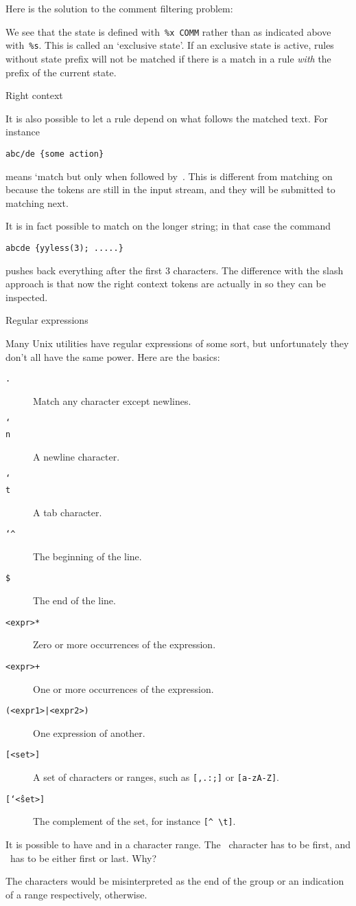 Here is the solution to the comment filtering problem:
%

%
We see that the state is defined
with~\verb+%x COMM+ rather than as indicated above with~\verb+%s+. This is
called an `exclusive state'. If an exclusive state is active, rules
without state prefix will not be matched if there is a match in a rule
\emph{with} the prefix of the current state.

 {Right context}

It is also possible to let a rule depend on what follows the matched
text. For instance
\begin{verbatim}
abc/de {some action}
\end{verbatim}
means `match  but only when followed by~. This is
different from matching on  because the  tokens are
still in the input stream, and they will be submitted to matching next.

It is in fact possible to match on the longer string; in that case the
command
\begin{verbatim}
abcde {yyless(3); .....}
\end{verbatim}
pushes back everything after the first 3 characters. The difference
with the slash approach is that now the right context tokens are
actually in  so they can be inspected.

 {Regular expressions}
\label{sec:regexp}

\def\titem#1{\item[{\tt #1}]}

Many Unix utilities have regular expressions of some sort, but
unfortunately they don't all have the same power. Here are the basics:
\begin{description}
\titem{.} Match any character except newlines.
\titem{\char`\\n} A newline character.
\titem{\char`\\t} A tab character.
\titem{\char`\^} The beginning of the line.
\titem{\$} The end of the line.
\titem{<expr>*} Zero or more occurrences of the expression.
\titem{<expr>+} One or more occurrences of the expression.
\titem{(<expr1>|<expr2>)} One expression of another.
\titem{{[<set>]}} A set of characters or ranges, such as \verb+[,.:;]+
  or \verb+[a-zA-Z]+.
\titem{{[\char`\^<set>]}} The complement of the set, for instance
\verb+[^ \t]+.
\end{description}
\begin{594exercise}
It is possible to have \n{]} and \n{-} in a character range. The
  \n{]}~character has to be first, and \n{-}~has to be either first or
    last. Why?
\end{594exercise}
\begin{answer}
The characters would be misinterpreted as the end of the group or an
indication of a range respectively, otherwise.
\end{answer}


